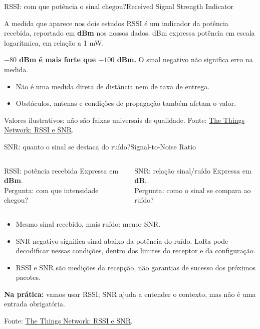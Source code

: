\begin{frame}{RSSI: com que potência o sinal chegou?}{Received Signal Strength Indicator}
\begin{block}{A medida que aparece nos dois estudos}
RSSI é um indicador da potência recebida, reportado em \textbf{dBm} nos nossos dados.
dBm expressa potência em escala logarítmica, em relação a 1 mW.
\end{block}
\centering
{}
\par\vspace{6mm}
\raggedright
\textbf{$-80$ dBm é mais forte que $-100$ dBm.} O sinal negativo não significa erro na medida.
\begin{itemize}
\item Não é uma medida direta de distância nem de taxa de entrega.
\item Obstáculos, antenas e condições de propagação também afetam o valor.
\end{itemize}
\scriptsize Valores ilustrativos; não são faixas universais de qualidade.
Fonte: \href{https://www.thethingsnetwork.org/docs/lorawan/rssi-and-snr/}{The Things Network: RSSI e SNR}.
\end{frame}

\begin{frame}{SNR: quanto o sinal se destaca do ruído?}{Signal-to-Noise Ratio}
\begin{columns}[T]
\begin{block}{RSSI: potência recebida}
Expressa em \textbf{dBm}.\\[2mm]
Pergunta: com que intensidade chegou?
\end{block}
\begin{block}{SNR: relação sinal/ruído}
Expressa em \textbf{dB}.\\[2mm]
Pergunta: como o sinal se compara ao ruído?
\end{block}
\end{columns}
\vspace{2mm}
\begin{itemize}
\item Mesmo sinal recebido, mais ruído: menor SNR.
\item SNR negativo significa sinal abaixo da potência do ruído. LoRa pode decodificar nessas condições, dentro dos limites do receptor e da configuração.
\item RSSI e SNR são medições da recepção, não garantias de sucesso dos próximos pacotes.
\end{itemize}
\textbf{Na prática:} vamos usar RSSI; SNR ajuda a entender o contexto, mas não é uma entrada obrigatória.
\par\vspace{2mm}
\scriptsize Fonte: \href{https://www.thethingsnetwork.org/docs/lorawan/rssi-and-snr/}{The Things Network: RSSI e SNR}.
\end{frame}

